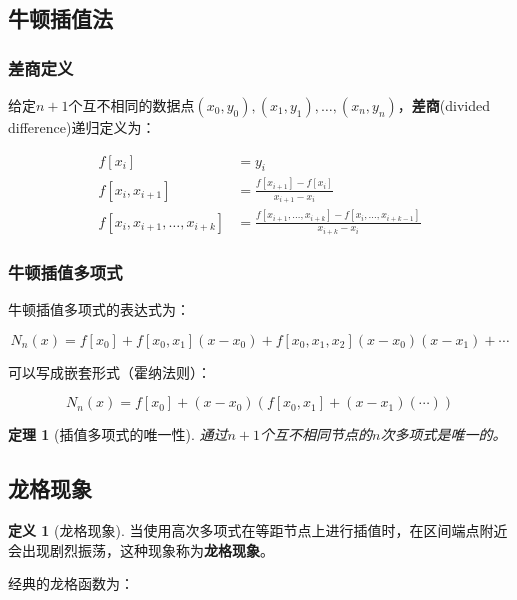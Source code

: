 \documentclass[a4paper,12pt]{article}
\newtheorem{theorem}{定理}[section]
\theoremstyle{definition}
\newtheorem{definition}{定义}[section]
\begin{document}
\subsection{牛顿插值法}

\subsubsection{差商定义}

给定$n+1$个互不相同的数据点$(x_0, y_0), (x_1, y_1), \ldots, (x_n, y_n)$，\textbf{差商}(divided difference)递归定义为：

\begin{align}
f[x_i] &= y_i \\
f[x_i, x_{i+1}] &= \frac{f[x_{i+1}] - f[x_i]}{x_{i+1} - x_i} \\
f[x_i, x_{i+1}, \ldots, x_{i+k}] &= \frac{f[x_{i+1}, \ldots, x_{i+k}] - f[x_i, \ldots, x_{i+k-1}]}{x_{i+k} - x_i}
\end{align}

\subsubsection{牛顿插值多项式}

牛顿插值多项式的表达式为：

\begin{equation}
N_n(x) = f[x_0] + f[x_0, x_1](x - x_0) + f[x_0, x_1, x_2](x - x_0)(x - x_1) + \cdots
\end{equation}

可以写成嵌套形式（霍纳法则）：

\begin{equation}
N_n(x) = f[x_0] + (x - x_0)\left(f[x_0, x_1] + (x - x_1)\left(\cdots\right)\right)
\end{equation}

\begin{theorem}[插值多项式的唯一性]
通过$n+1$个互不相同节点的$n$次多项式是唯一的。
\end{theorem}

\subsection{龙格现象}

\begin{definition}[龙格现象]
当使用高次多项式在等距节点上进行插值时，在区间端点附近会出现剧烈振荡，这种现象称为\textbf{龙格现象}。
\end{definition}

经典的龙格函数为：
\end{document}
